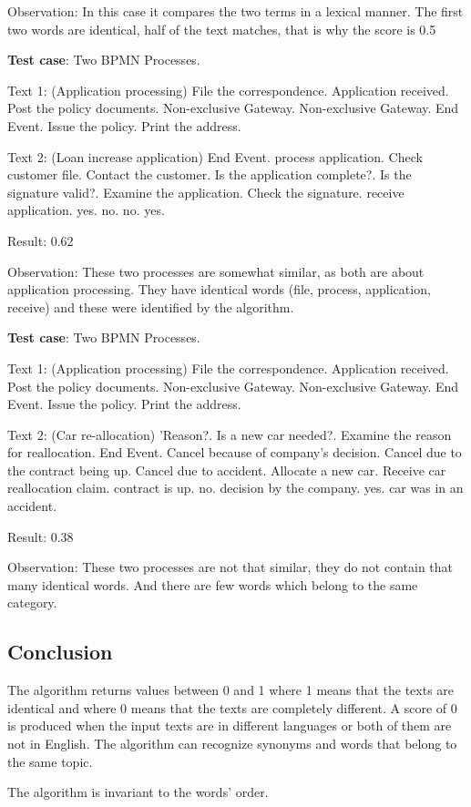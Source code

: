 Observation: In this case it compares the two terms in a lexical manner. The first two words are identical, half of the text matches, that is why the score is 0.5

\textbf{Test case}: Two BPMN Processes.

Text 1: (Application processing) File the correspondence. Application received. Post the policy documents. Non-exclusive Gateway. Non-exclusive Gateway. End Event. Issue the policy. Print the address. 

Text 2: (Loan increase application) End Event. process application. Check customer file. Contact the customer. Is the application complete?. Is the signature valid?. Examine the application. Check the signature. receive application. yes. no. no. yes. 

Result: 0.62

Observation: These two processes are somewhat similar, as both are about application processing. They have identical words (file, process, application, receive) and these were identified by the algorithm.

\textbf{Test case}: Two BPMN Processes.

Text 1: (Application processing) File the correspondence. Application received. Post the policy documents. Non-exclusive Gateway. Non-exclusive Gateway. End Event. Issue the policy. Print the address. 

Text 2: (Car re-allocation) 'Reason?. Is a new car needed?. Examine the reason for reallocation. End Event. Cancel because of company's decision. Cancel due to the contract being up. Cancel due to accident. Allocate a new car. Receive car reallocation
claim. contract is up. no. decision by the company. yes. car was in an accident. 

Result: 0.38

Observation: These two processes are not that similar, they do not contain that many identical words. And there are few words which belong to the same category.


\subsection{Conclusion}

The algorithm returns values between 0 and 1 where 1 means that the texts are identical and where 0 means that the texts are completely different. A score of 0 is produced when the input texts are in different languages or both of them are not in English. The algorithm can recognize synonyms and words that belong to the same topic.

The algorithm is invariant to the words' order.